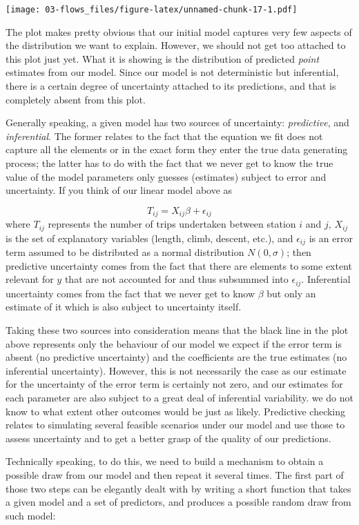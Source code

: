 \documentclass[]{book}
\begin{document}
\texttt{[image: 03-flows\_files/figure-latex/unnamed-chunk-17-1.pdf]}

The plot makes pretty obvious that our initial model captures very few aspects of the distribution we want to explain. However, we should not get too attached to this plot just yet. What it is showing is the distribution of predicted \emph{point} estimates from our model. Since our model is not deterministic but inferential, there is a certain degree of uncertainty attached to its predictions, and that is completely absent from this plot.

Generally speaking, a given model has two sources of uncertainty: \emph{predictive}, and \emph{inferential}. The former relates to the fact that the equation we fit does not capture all the elements or in the exact form they enter the true data generating process; the latter has to do with the fact that we never get to know the true value of the model parameters only guesses (estimates) subject to error and uncertainty. If you think of our linear model above as

\[
T_{ij} = X_{ij}\beta + \epsilon_{ij}
\]
where \(T_{ij}\) represents the number of trips undertaken between station \(i\) and \(j\), \(X_{ij}\) is the set of explanatory variables (length, climb, descent, etc.), and \(\epsilon_{ij}\) is an error term assumed to be distributed as a normal distribution \(N(0, \sigma)\); then predictive uncertainty comes from the fact that there are elements to some extent relevant for \(y\) that are not accounted for and thus subsummed into \(\epsilon_{ij}\). Inferential uncertainty comes from the fact that we never get to know \(\beta\) but only an estimate of it which is also subject to uncertainty itself.

Taking these two sources into consideration means that the black line in the plot above represents only the behaviour of our model we expect if the error term is absent (no predictive uncertainty) and the coefficients are the true estimates (no inferential uncertainty). However, this is not necessarily the case as our estimate for the uncertainty of the error term is certainly not zero, and our estimates for each parameter are also subject to a great deal of inferential variability. we do not know to what extent other outcomes would be just as likely. Predictive checking relates to simulating several feasible scenarios under our model and use those to assess uncertainty and to get a better grasp of the quality of our predictions.

Technically speaking, to do this, we need to build a mechanism to obtain a possible draw from our model and then repeat it several times. The first part of those two steps can be elegantly dealt with by writing a short function that takes a given model and a set of predictors, and produces a possible random draw from such model:
\end{document}
